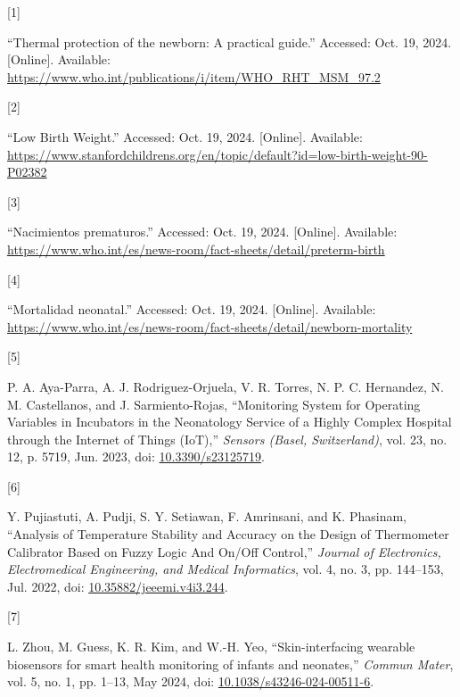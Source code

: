 \documentclass{article}
\newlength{\cslhangindent}
\newlength{\csllabelwidth}
\newenvironment{CSLReferences}[2] %
 {\begin{list}{}{%
  \setlength{\itemindent}{0pt}
  \setlength{\leftmargin}{0pt}
  \setlength{\parsep}{0pt}
  \ifodd #1
   \setlength{\leftmargin}{\cslhangindent}
   \setlength{\itemindent}{-1\cslhangindent}
  \fi
  \setlength{\itemsep}{#2\baselineskip}}}
 {\end{list}}
\newcommand{\CSLLeftMargin}[1]{\parbox[t]{\csllabelwidth}{#1}}
\newcommand{\CSLRightInline}[1]{\parbox[t]{\linewidth - \csllabelwidth}{#1}\break}
\begin{document}
\label{refs}
\begin{CSLReferences}{0}{0}
\CSLLeftMargin{{[}1{]} }%
\CSLRightInline{{``Thermal protection of the newborn: A practical
guide.''} Accessed: Oct. 19, 2024. {[}Online{]}. Available:
\url{https://www.who.int/publications/i/item/WHO_RHT_MSM_97.2}}

\CSLLeftMargin{{[}2{]} }%
\CSLRightInline{{``Low {Birth} {Weight}.''} Accessed: Oct. 19, 2024.
{[}Online{]}. Available:
\url{https://www.stanfordchildrens.org/en/topic/default?id=low-birth-weight-90-P02382}}

\CSLLeftMargin{{[}3{]} }%
\CSLRightInline{{``Nacimientos prematuros.''} Accessed: Oct. 19, 2024.
{[}Online{]}. Available:
\url{https://www.who.int/es/news-room/fact-sheets/detail/preterm-birth}}

\CSLLeftMargin{{[}4{]} }%
\CSLRightInline{{``Mortalidad neonatal.''} Accessed: Oct. 19, 2024.
{[}Online{]}. Available:
\url{https://www.who.int/es/news-room/fact-sheets/detail/newborn-mortality}}

\CSLLeftMargin{{[}5{]} }%
\CSLRightInline{P. A. Aya-Parra, A. J. Rodriguez-Orjuela, V. R. Torres,
N. P. C. Hernandez, N. M. Castellanos, and J. Sarmiento-Rojas,
{``Monitoring {System} for {Operating} {Variables} in {Incubators} in
the {Neonatology} {Service} of a {Highly} {Complex} {Hospital} through
the {Internet} of {Things} ({IoT}),''} \emph{Sensors (Basel,
Switzerland)}, vol. 23, no. 12, p. 5719, Jun. 2023, doi:
\href{https://doi.org/10.3390/s23125719}{10.3390/s23125719}.}

\CSLLeftMargin{{[}6{]} }%
\CSLRightInline{Y. Pujiastuti, A. Pudji, S. Y. Setiawan, F. Amrinsani,
and K. Phasinam, {``Analysis of {Temperature} {Stability} and {Accuracy}
on the {Design} of {Thermometer} {Calibrator} {Based} on {Fuzzy} {Logic}
{And} {On}/{Off} {Control},''} \emph{Journal of Electronics,
Electromedical Engineering, and Medical Informatics}, vol. 4, no. 3, pp.
144--153, Jul. 2022, doi:
\href{https://doi.org/10.35882/jeeemi.v4i3.244}{10.35882/jeeemi.v4i3.244}.}

\CSLLeftMargin{{[}7{]} }%
\CSLRightInline{L. Zhou, M. Guess, K. R. Kim, and W.-H. Yeo,
{``Skin-interfacing wearable biosensors for smart health monitoring of
infants and neonates,''} \emph{Commun Mater}, vol. 5, no. 1, pp. 1--13,
May 2024, doi:
\href{https://doi.org/10.1038/s43246-024-00511-6}{10.1038/s43246-024-00511-6}.}


\end{CSLReferences}
\end{document}
